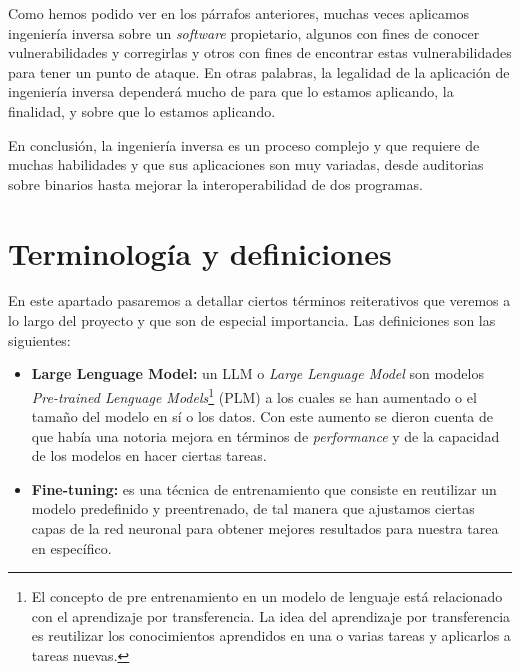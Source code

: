 Como hemos podido ver en los párrafos anteriores, muchas veces aplicamos ingeniería inversa sobre
un \textit{software} propietario, algunos con fines de conocer vulnerabilidades y corregirlas
y otros con fines de encontrar estas vulnerabilidades para tener un punto de ataque. En
otras palabras, la legalidad de la aplicación de ingeniería inversa dependerá mucho
de para que lo estamos aplicando, la finalidad, y sobre que lo estamos aplicando.

En conclusión, la ingeniería inversa es un proceso complejo y que requiere de muchas habilidades 
y que sus aplicaciones son muy variadas, desde auditorias sobre binarios hasta mejorar
la interoperabilidad de dos programas.

\section{Terminología y definiciones}
\label{sec:terminalogia}


En este apartado pasaremos a detallar ciertos términos reiterativos que veremos a lo
largo del proyecto y que son de especial importancia. Las definiciones son las siguientes:

\begin{itemize}
    \item \textbf{Large Lenguage Model:} un LLM o \textit{Large Lenguage Model} son 
        modelos \textit{Pre-trained Lenguage Models}\footnote{El concepto de pre
        entrenamiento en un modelo de lenguaje está relacionado con el aprendizaje
        por transferencia. La idea del aprendizaje por transferencia es reutilizar
        los conocimientos aprendidos en una o varias tareas y aplicarlos a tareas
        nuevas.} (PLM) a los cuales se han aumentado o el tamaño del modelo en sí
        o los datos. Con este aumento se dieron cuenta de que había una notoria mejora
        en términos de \textit{performance} y de la capacidad de los modelos en hacer
        ciertas tareas. \cite{ZhaoWayneXin2023ASoL}
    \item \textbf{Fine-tuning:} es una técnica de entrenamiento que consiste en
        reutilizar un modelo predefinido y preentrenado, de tal manera que ajustamos
        ciertas capas de la red neuronal para obtener mejores resultados para nuestra
        tarea en específico.
\end{itemize}